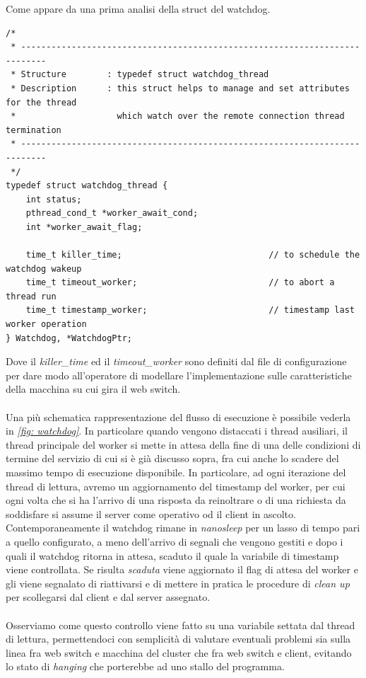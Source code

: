 \documentclass[italian]{tktltiki2}
\begin{document}
Come appare da una prima analisi della struct del watchdog.
\begin{lstlisting}
/*
 * ---------------------------------------------------------------------------
 * Structure        : typedef struct watchdog_thread
 * Description      : this struct helps to manage and set attributes for the thread
 *                    which watch over the remote connection thread termination
 * ---------------------------------------------------------------------------
 */
typedef struct watchdog_thread {
    int status;                                     
    pthread_cond_t *worker_await_cond;             
    int *worker_await_flag;

    time_t killer_time;                             // to schedule the watchdog wakeup
    time_t timeout_worker;                          // to abort a thread run
    time_t timestamp_worker;                        // timestamp last worker operation
} Watchdog, *WatchdogPtr;

\end{lstlisting}
Dove il \emph{killer\_time} ed il \emph{timeout\_worker} sono definiti dal file di configurazione per dare modo all'operatore di modellare l'implementazione sulle caratteristiche della macchina su cui gira il web switch. \\\\
Una più schematica rappresentazione del flusso di esecuzione è possibile vederla in \emph{\ref{fig: watchdog}}.
In particolare quando vengono distaccati i thread ausiliari, il thread principale del worker si mette in attesa della fine di una delle condizioni di termine del servizio di cui si è già discusso sopra, fra cui anche lo scadere del massimo tempo di esecuzione disponibile. In particolare, ad ogni iterazione del thread di lettura, avremo un aggiornamento del timestamp del worker, per cui ogni volta che si ha l'arrivo di una risposta da reinoltrare o di una richiesta da soddisfare si assume il server come operativo od il client in ascolto. \\ 
Contemporaneamente il watchdog rimane in \emph{nanosleep} per un lasso di tempo pari a quello configurato, a meno dell'arrivo di segnali che vengono gestiti e dopo i quali il watchdog ritorna in attesa, scaduto il quale la variabile di timestamp viene controllata. Se risulta \emph{scaduta} viene aggiornato il flag di attesa del worker e gli viene segnalato di riattivarsi e di mettere in pratica le procedure di \emph{clean up} per scollegarsi dal client e dal server assegnato. \\\\
Osserviamo come questo controllo viene fatto su una variabile settata dal thread di lettura, permettendoci con semplicità di valutare eventuali problemi sia sulla linea fra web switch e macchina del cluster che fra web switch e client, evitando lo stato di \emph{hanging} che porterebbe ad uno stallo del programma.
\newpage
\end{document}
